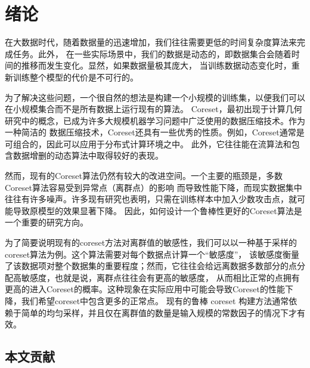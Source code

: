 
\chapter{绪论}

在大数据时代，随着数据量的迅速增加，我们往往需要更低的时间复杂度算法来完成任务。此外，
在一些实际场景中，我们的数据是动态的，即数据集合会随着时间的推移而发生变化。显然，如果数据量极其庞大，
当训练数据动态变化时，重新训练整个模型的代价是不可行的。

为了解决这些问题，一个很自然的想法是构建一个小规模的训练集，以便我们可以在小规模集合而不是所有数据上运行现有的算法。
Coreset，最初出现于计算几何研究中的概念，已成为许多大规模机器学习问题中广泛使用的数据压缩技术。作为一种简洁的
数据压缩技术，Coreset还具有一些优秀的性质。例如，Coreset通常是可组合的，因此可以应用于分布式计算环境之中。
此外，它往往能在流算法和包含数据增删的动态算法中取得较好的表现。

然而，现有的Coreset算法仍然有较大的改进空间。一个主要的瓶颈是，多数Coreset算法容易受到异常点（离群点）的影响
而导致性能下降，而现实数据集中往往有许多噪声。许多现有研究也表明，只需在训练样本中加入少数攻击点，就可能导致原模型的效果显著下降。
因此，如何设计一个鲁棒性更好的Coreset算法是一个重要的研究方向。

为了简要说明现有的coreset方法对离群值的敏感性，我们可以以一种基于采样的coreset算法为例。这个算法需要对每个数据点计算一个“敏感度”，
该敏感度衡量了该数据项对整个数据集的重要程度；然而，它往往会给远离数据多数部分的点分配高敏感度，也就是说，离群点往往会有更高的敏感度，
从而相比正常的点拥有更高的进入Coreset的概率。这种现象在实际应用中可能会导致Coreset的性能下降，我们希望coreset中包含更多的正常点。
现有的鲁棒 coreset 构建方法通常依赖于简单的均匀采样，并且仅在离群值的数量是输入规模的常数因子的情况下才有效。


\section{本文贡献}





